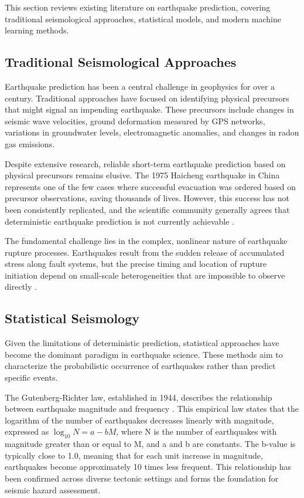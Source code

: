 
This section reviews existing literature on earthquake prediction, covering traditional seismological approaches, statistical models, and modern machine learning methods.

\subsection{Traditional Seismological Approaches}

Earthquake prediction has been a central challenge in geophysics for over a century. Traditional approaches have focused on identifying physical precursors that might signal an impending earthquake. These precursors include changes in seismic wave velocities, ground deformation measured by GPS networks, variations in groundwater levels, electromagnetic anomalies, and changes in radon gas emissions.

Despite extensive research, reliable short-term earthquake prediction based on physical precursors remains elusive. The 1975 Haicheng earthquake in China represents one of the few cases where successful evacuation was ordered based on precursor observations, saving thousands of lives. However, this success has not been consistently replicated, and the scientific community generally agrees that deterministic earthquake prediction is not currently achievable \cite{rundle2003}.

The fundamental challenge lies in the complex, nonlinear nature of earthquake rupture processes. Earthquakes result from the sudden release of accumulated stress along fault systems, but the precise timing and location of rupture initiation depend on small-scale heterogeneities that are impossible to observe directly \cite{bouchon2013}.

\subsection{Statistical Seismology}

Given the limitations of deterministic prediction, statistical approaches have become the dominant paradigm in earthquake science. These methods aim to characterize the probabilistic occurrence of earthquakes rather than predict specific events.

The Gutenberg-Richter law, established in 1944, describes the relationship between earthquake magnitude and frequency \cite{gutenberg1944}. This empirical law states that the logarithm of the number of earthquakes decreases linearly with magnitude, expressed as $\log_{10}N = a - bM$, where N is the number of earthquakes with magnitude greater than or equal to M, and a and b are constants. The b-value is typically close to 1.0, meaning that for each unit increase in magnitude, earthquakes become approximately 10 times less frequent. This relationship has been confirmed across diverse tectonic settings and forms the foundation for seismic hazard assessment.

